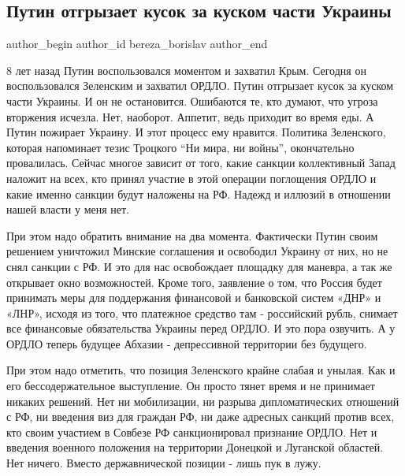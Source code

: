  
 
 
 
 
 
\subsection{Путин отгрызает кусок за куском части Украины}
\label{sec:22_02_2022.fb.bereza_borislav.1.putin_ukraina}
 
\ifcmt
 author_begin
   author_id bereza_borislav
 author_end
\fi

8 лет назад Путин воспользовался моментом и захватил Крым. Сегодня он
воспользовался Зеленским и захватил ОРДЛО. Путин отгрызает кусок за куском
части Украины. И он не остановится. Ошибаются те, кто думают, что угроза
вторжения исчезла. Нет, наоборот. Аппетит, ведь приходит во время еды. А Путин
пожирает Украину. И этот процесс ему нравится. Политика Зеленского, которая
напоминает тезис Троцкого \enquote{Ни мира, ни войны}, окончательно
провалилась. Сейчас многое зависит от того, какие санкции коллективный Запад
наложит на всех, кто принял участие в этой операции поглощения ОРДЛО и какие
именно санкции будут наложены на РФ. Надежд и иллюзий в отношении нашей власти
у меня нет.

При этом надо обратить внимание на два момента. Фактически Путин своим решением
уничтожил Минские соглашения и освободил Украину от них, но не снял санкции с
РФ. И это для нас освобождает площадку для маневра, а так же открывает окно
возможностей. Кроме того, заявление о том, что Россия будет принимать меры для
поддержания финансовой и банковской систем «ДНР» и «ЛНР», исходя из того, что
платежное средство там - российский рубль, снимает все финансовые обязательства
Украины перед ОРДЛО. И это пора озвучить. А у ОРДЛО теперь будущее Абхазии -
депрессивной территории без будущего. 

При этом надо отметить, что позиция Зеленского крайне слабая и унылая. Как и
его бессодержательное выступление. Он просто тянет время и не принимает никаких
решений. Нет ни мобилизации, ни разрыва дипломатических отношений с РФ, ни
введения виз для граждан РФ, ни даже адресных санкций против всех, кто своим
участием в Совбезе РФ санкционировал признание ОРДЛО. Нет и введения военного
положения на территории Донецкой и Луганской областей. Нет ничего. Вместо
державнической позиции - лишь пук в лужу. 

